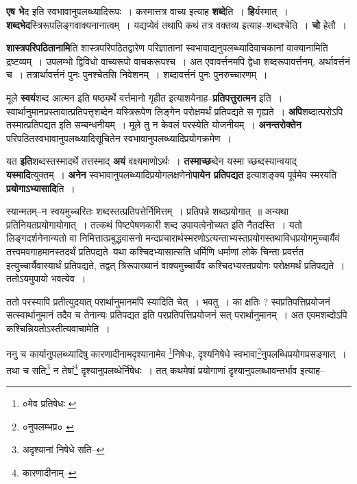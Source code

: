 \documentclass[article,12pt,a4paper]{memoir}
\begin{document}
	  \pstart \textbf{एष भे}\leavevmode{}द इति स्वभावानुपलब्ध्यादिरूपः । कस्मात्तत्र वाच्य इत्याह \textbf{शब्दे}ति । \textbf{हि}र्यस्मात् । \textbf{शब्दभेद}स्त्रिरूपलिङ्गवाक्यनानात्वम् । यद्यप्येवं तथापि कथं तत्र वक्तव्य इत्याह--शब्दश्चेति । \textbf{चो} हेतौ ।
	\pend
      

	  \pstart \textbf{शास्त्रपरिपठितानामि}ति शास्त्रपरिपठितद्वारेण परिज्ञातानां स्वभावाद्यनुपलब्ध्यादिवाचकानां वाक्यानामिति द्रष्टव्यम् । उपलम्भो द्विविधो वाच्यरूपो वाचकरूपश्च । अत एवावर्त्तनमपि द्वेधा शब्दरूपावर्त्तनम्, अर्थावर्त्तनं च । तत्रार्थावर्त्तनं पुनः पुनश्चेतसि निवेशनम् । शब्दावर्त्तनं पुनः पुनरुच्चारणम् ।
	\pend
      

	  \pstart मूले \textbf{स्वयं}शब्द आत्मन इति षष्ठ्यर्थे वर्त्तमानो गृहीत इत्याशयेनाह--\textbf{प्रतिपत्तुरात्मन} इति । स्वार्थानुमानप्रस्तावात्प्रतिपत्तृशब्देन यस्त्रिरूपेण लिङ्गेन परोक्षमर्थं प्रतिपद्यते स गृह्यते । \textbf{अपि}शब्दात्परोऽपि तस्मात्प्रतिपद्यत इति सम्बन्धनीयम् । मूले तु न केवलं परस्येति योजनीयम् । \textbf{अनन्तरोक्तेन} परिपठितस्वभावानुपलब्ध्यादिसूचितेन स्वभावानुपलब्ध्यादिप्रयोगक्रमेण ।
	\pend
      

	  \pstart यत \textbf{इति}शब्दस्तस्मादर्थे तत्तस्माद् \textbf{अयं} वक्ष्यमाणोऽर्थः । \textbf{तस्माच्छ}ब्देन यस्मा च्छब्दस्यान्वयाद् \textbf{यस्मादि}त्युक्तम् । \textbf{अनेन} स्वभावानुपलब्ध्यादिप्रयोगलक्षणेनो\textbf{पायेन प्रतिपद्यत} इत्याशङ्क्य पूर्वमेव स्मरयति \textbf{प्रयोगाऽभ्यासादि}ति ।
	\pend
      

	  \pstart स्यान्मतम्--न स्वयमुच्चरितः शब्दस्तत्प्रतिपत्तेर्निमित्तम् । प्रतिपन्ने शब्दप्रयोगात् ॥ अन्यथा प्रतिनियतप्रयोगायोगात् । तत्कथं पिष्टपेषणकारी शब्द उपायत्वेनोच्यत इति नैतदस्ति । यतो लिङ्गदर्शनेनान्यतो वा निमित्तात्प्रबुद्धवासनो मन्दप्रचारार्थस्मरणोऽत्यन्ताभ्यस्तप्रयोगस्तथाविधप्रयोगमुच्चार्यैवं तत्त्वमवगाहमानस्तदर्थं प्रतिपद्यते--यथा कश्चिदभ्यासात्सति धर्मिणि धर्माणां लोके चिन्ता प्रवर्त्तत इत्युच्चार्यैवास्यार्थं प्रतिपद्यते, तद्वत् त्रिरूपाख्यानं वाक्यमुच्चार्यैव कश्चिदभ्यस्तप्रयोगः परोक्षमर्थं प्रतिपद्यते । ततोऽयमुपायो भवत्येव ।
	\pend
      

	  \pstart ततो परस्यापि प्रतीत्युदयात् परार्थानुमानमपि स्यादिति चेत् । भवतु । का क्षतिः ? स्वप्रतिपत्तिप्रयोजनं सत्स्वार्थानुमानं तदैव च तेनान्यः प्रतिपद्यत इति परप्रतिपत्तिप्रयोजनं सत् परार्थानुमानम् । अत एवमशब्दोऽपि कश्चिन्नियतोऽस्तीत्यवाचामेति ।
	\pend
	  \bigskip
	  \begingroup
	

	  \pstart ननु च कार्यानुपलब्ध्यादिषु कारणादीनामदृश्यानामेव \footnote{०मेव प्रतिषेधः \cite{dp-msA} \cite{dp-edP} \cite{dp-edH} \cite{dp-edE} \cite{dp-edN}}\-निषेधः, दृश्यनिषेधे स्वभावा\footnote{०नुपलम्भप्र० \cite{dp-msA} \cite{dp-msB} \cite{dp-edP} \cite{dp-edH} \cite{dp-edE} \cite{dp-edN}}\-नुपलब्धिप्रयोगप्रसङ्गात् । तथा च सति\footnote{अदृश्यानां निषेधे सति--\cite{dp-msD-n}} न तेषां\footnote{कारणादीनाम्--\cite{dp-msD-n}} दृश्यानुपलब्धेर्निषेधः । तत् कथमेषां प्रयोगाणां दृश्यानुपलब्धावन्तर्भाव इत्याह--
	\pend
       
\end{document}
